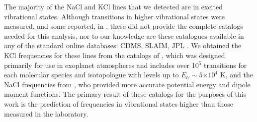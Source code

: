 \documentclass[12pt]{article}
\def\ee#1{\ensuremath{\times10^{#1}}}
\begin{document}
The majority of the NaCl and KCl lines that we detected are in excited
vibrational states.  Although transitions in higher vibrational states were
measured, and some reported, in \cite{Caris2004a}, these did not provide the
complete catalogs needed for this analysis, nor to our knowledge are these
catalogues available in any of the standard online databases: CDMS, SLAIM, JPL
\cite{Muller2005a,Lovas2005b,Pickett1998a}.  We obtained the KCl
frequencies for these lines from the catalogs of \cite{Barton2014a}, which was
designed primarily for use in exoplanet atmospheres and includes over 10$^5$
transitions for each molecular species and isotopologue with levels up to
$E_U\sim5\ee{4}$ K, and the NaCl frequencies from \cite{Cabezas2016a}, who
provided more accurate potential energy and dipole moment functions. The
primary result of these catalogs for the purposes of this work is the
prediction of frequencies in vibrational states higher than those measured in
the laboratory. 


\end{document}
